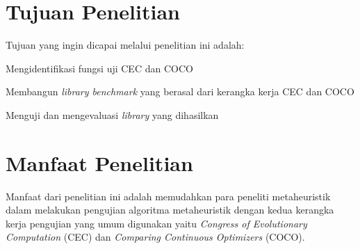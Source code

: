 \section{Tujuan Penelitian}
Tujuan yang ingin dicapai melalui penelitian ini adalah:
\begin{packed_enum}
  \item Mengidentifikasi fungsi uji CEC dan COCO
  \item Membangun \textit{library benchmark} yang berasal dari kerangka kerja CEC dan COCO
  \item Menguji dan mengevaluasi \textit{library} yang dihasilkan
\end{packed_enum}

\section{Manfaat Penelitian}
Manfaat dari penelitian ini adalah memudahkan para peneliti metaheuristik dalam melakukan pengujian algoritma metaheuristik dengan kedua kerangka kerja pengujian yang umum digunakan yaitu \textit{Congress of Evolutionary Computation} (CEC) dan \textit{Comparing Continuous Optimizers} (COCO).